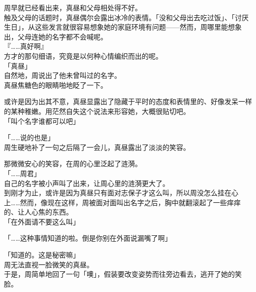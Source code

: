 周早就已经看出来，真昼和父母相处得不好。\\

触及父母的话题时，真昼偶尔会露出冰冷的表情。「没和父母出去吃过饭」、「讨厌生日」，从这些发言就很容易想象她的家庭环境有问题——然而，周哪里能想象出，父母连她的名字都不会喊呢。\\

『……真好啊』\\

方才的那句细语，究竟是以何种心情编织而出的呢。\\

「真昼」\\

自然地，周说出了他未曾叫过的名字。\\

真昼焦糖色的眼睛啪地眨了一下。

或许是因为出其不意，真昼显露出了隐藏于平时的态度和表情里的、好像发呆一样的某种稚嫩。用茫然自失这个说法来形容她，大概很贴切吧。\\

「叫个名字谁都可以吧」

「……说的也是」\\

周生硬地补了一句之后隔了一会儿，真昼露出了淡淡的笑容。

那微微安心的笑容，在周的心里泛起了涟漪。\\

「……周君」\\

自己的名字被小声叫了出来，让周心里的涟漪更大了。\\

到刚才为止，或许是因为真昼只有面对志保子才这么叫，所以周没怎么挂在心上……然而，像现在这样，周被面对面叫出名字之后，胸中就翻滚起了一些痒痒的、让人心焦的东西。\\

「在外面请不要这么叫」

「……这种事情知道的啦。倒是你别在外面说漏嘴了啊」

「知道的。这是秘密嘛」\\

周无法直视一脸微笑的真昼。\\

于是，周简单地回了一句「噢」，假装要改变姿势而往旁边看去，逃开了她的笑脸。

